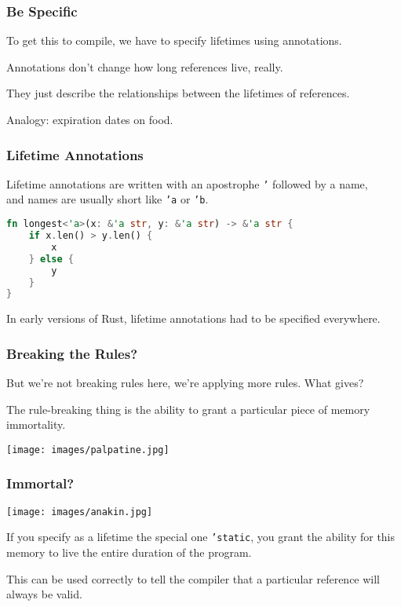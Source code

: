 \begin{frame}
\frametitle{Be Specific}

To get this to compile, we have to specify lifetimes using annotations. 

Annotations don't change how long references live, really.

They just describe the relationships between the lifetimes of references.

Analogy: expiration dates on food.

\end{frame}


\begin{frame}[fragile]
\frametitle{Lifetime Annotations}
Lifetime annotations are written with an apostrophe \texttt{'} followed by a name, \\
\qquad and names are usually short like \texttt{'a} or \texttt{'b}. 

\begin{lstlisting}[language=Rust]
fn longest<'a>(x: &'a str, y: &'a str) -> &'a str {
    if x.len() > y.len() {
        x
    } else {
        y
    }
}
\end{lstlisting}

In early versions of Rust, lifetime annotations had to be specified everywhere.

\end{frame}

\begin{frame}
\frametitle{Breaking the Rules?}
But we're not breaking rules here, we're applying more rules. What gives? 

The rule-breaking thing is the ability to grant a particular piece of memory immortality. 

\begin{center}
	\texttt{[image: images/palpatine.jpg]}
\end{center}


\end{frame}


\begin{frame}
\frametitle{Immortal?}
\begin{center}
	\texttt{[image: images/anakin.jpg]}
\end{center}

If you specify as a lifetime the special one \texttt{'static}, you grant the ability for this memory to live the entire duration of the program.

This can be used correctly to tell the compiler that a particular reference will always be valid.

\end{frame}


